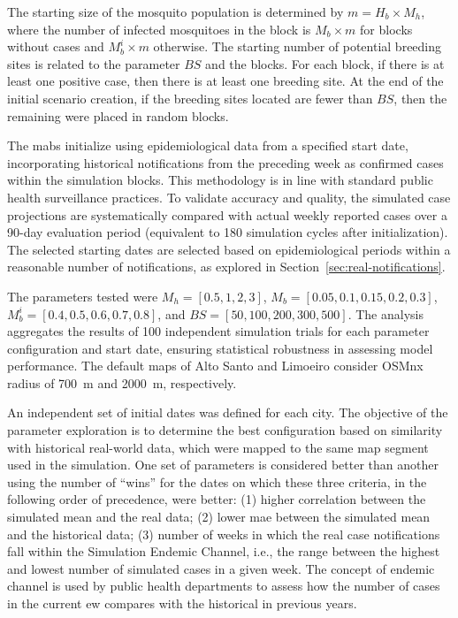 The starting size of the mosquito population is determined by $m = H_b \times
	M_h$, where the number of infected mosquitoes in the block is $M_b \times m$ for
blocks without cases and $M_b^{i} \times m$ otherwise. The starting number of
potential breeding sites is related to the parameter $BS$ and the blocks. For
each block, if there is at least one positive case, then there is at least one
breeding site. At the end of the initial scenario creation, if the breeding
sites located are fewer than $BS$, then the remaining were placed in random
blocks.

The \gls{mabs} initialize using epidemiological data from a specified start
date, incorporating historical notifications from the preceding week as
confirmed cases within the simulation blocks. This methodology is in line with
standard public health surveillance practices. To validate accuracy and quality,
the simulated case projections are systematically compared with actual weekly
reported cases over a 90-day evaluation period (equivalent to 180 simulation
cycles after initialization). The selected starting dates are selected based on
epidemiological periods within a reasonable number of notifications, as explored
in Section~\ref{sec:real-notifications}.

The parameters tested were $M_h = [0.5, 1, 2, 3]$, $M_b = [0.05, 0.1, 0.15, 0.2,
	0.3]$, $M_b^{i} = [0.4, 0.5, 0.6, 0.7, 0.8]$, and $BS = [50, 100, 200, 300,
	500]$. The analysis aggregates the results of 100 independent simulation trials
for each parameter configuration and start date, ensuring statistical robustness
in assessing model performance. The default maps of Alto Santo and Limoeiro
consider OSMnx radius of 700~m and 2000~m, respectively.

An independent set of initial dates was defined for each city. The objective of
the parameter exploration is to determine the best configuration based on
similarity with historical real-world data, which were mapped to the same map
segment used in the simulation. One set of parameters is considered better than
another using the number of ``wins'' for the dates on which these three
criteria, in the following order of precedence, were better: (1) higher
correlation between the simulated mean and the real data; (2) lower \gls{mae}
between the simulated mean and the historical data; (3) number of weeks in which
the real case notifications fall within the Simulation Endemic Channel, i.e.,
the range between the highest and lowest number of simulated cases in a given
week. The concept of endemic channel is used by public health departments to
assess how the number of cases in the current \gls{ew} compares with the
historical in previous years.


